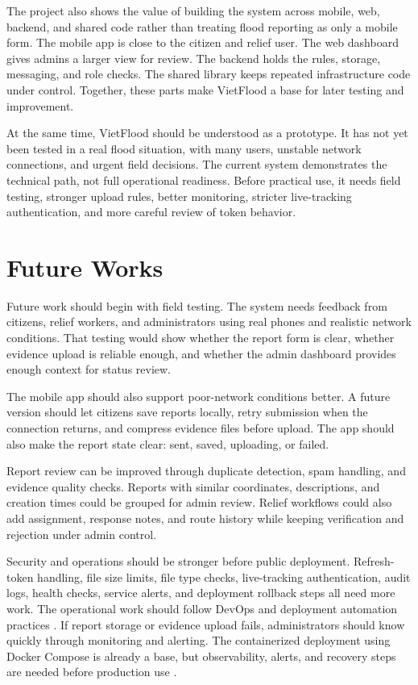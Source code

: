 The project also shows the value of building the system across mobile, web, backend, and shared code rather than treating flood reporting as only a mobile form. The mobile app is close to the citizen and relief user. The web dashboard gives admins a larger view for review. The backend holds the rules, storage, messaging, and role checks. The shared library keeps repeated infrastructure code under control. Together, these parts make VietFlood a base for later testing and improvement.

At the same time, VietFlood should be understood as a prototype. It has not yet been tested in a real flood situation, with many users, unstable network connections, and urgent field decisions. The current system demonstrates the technical path, not full operational readiness. Before practical use, it needs field testing, stronger upload rules, better monitoring, stricter live-tracking authentication, and more careful review of token behavior.

\section{Future Works}

Future work should begin with field testing. The system needs feedback from citizens, relief workers, and administrators using real phones and realistic network conditions. That testing would show whether the report form is clear, whether evidence upload is reliable enough, and whether the admin dashboard provides enough context for status review.

The mobile app should also support poor-network conditions better. A future version should let citizens save reports locally, retry submission when the connection returns, and compress evidence files before upload. The app should also make the report state clear: sent, saved, uploading, or failed.

Report review can be improved through duplicate detection, spam handling, and evidence quality checks. Reports with similar coordinates, descriptions, and creation times could be grouped for admin review. Relief workflows could also add assignment, response notes, and route history while keeping verification and rejection under admin control.

Security and operations should be stronger before public deployment. Refresh-token handling, file size limits, file type checks, live-tracking authentication, audit logs, health checks, service alerts, and deployment rollback steps all need more work. The operational work should follow DevOps and deployment automation practices \cite{kim2016devopsHandbook,humble2010continuousDelivery}. If report storage or evidence upload fails, administrators should know quickly through monitoring and alerting. The containerized deployment using Docker Compose is already a base, but observability, alerts, and recovery steps are needed before production use \cite{dockerComposeDocs}.

